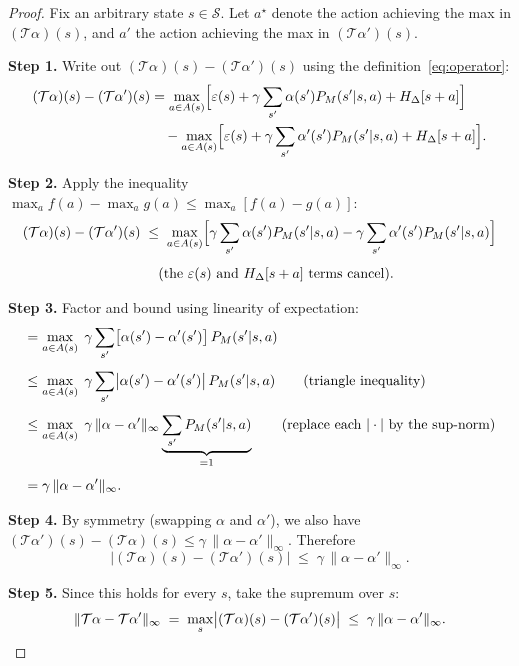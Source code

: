 \documentclass[11pt]{article}
\begin{document}
\begin{proof}
Fix an arbitrary state $s \in \mathcal{S}$.  Let $a^\star$ denote the action
achieving the max in $(\mathcal{T}\alpha)(s)$, and $a'$ the action achieving
the max in $(\mathcal{T}\alpha')(s)$.

\medskip
\textbf{Step 1.} Write out $(\mathcal{T}\alpha)(s) - (\mathcal{T}\alpha')(s)$
using the definition~\eqref{eq:operator}:
\begin{align}
  (\mathcal{T}\alpha)(s) - (\mathcal{T}\alpha')(s)
  &= \max_{a \in A(s)} \Bigl[\varepsilon(s)
     + \gamma \sum_{s'} \alpha(s') P_M(s'|s,a) + H_\Delta[s+a]\Bigr]
     \notag \\
  &\quad - \max_{a \in A(s)} \Bigl[\varepsilon(s)
     + \gamma \sum_{s'} \alpha'(s') P_M(s'|s,a) + H_\Delta[s+a]\Bigr].
     \label{eq:diff}
\end{align}

\textbf{Step 2.} Apply the inequality $\max_a f(a) - \max_a g(a) \le \max_a [f(a) - g(a)]$:
\begin{align}
  (\mathcal{T}\alpha)(s) - (\mathcal{T}\alpha')(s)
  &\;\le\; \max_{a \in A(s)} \Bigl[
    \gamma \sum_{s'} \alpha(s') P_M(s'|s,a)
    - \gamma \sum_{s'} \alpha'(s') P_M(s'|s,a)
  \Bigr] \notag \\[4pt]
  &\quad\; \text{(the $\varepsilon(s)$ and $H_\Delta[s+a]$ terms cancel).}
  \label{eq:cancel}
\end{align}

\textbf{Step 3.} Factor and bound using linearity of expectation:
\begin{align}
  &= \max_{a \in A(s)}\; \gamma \sum_{s'} \bigl[\alpha(s') - \alpha'(s')\bigr]
     \, P_M(s'|s,a) \notag \\[4pt]
  &\le \max_{a \in A(s)}\; \gamma \sum_{s'} \bigl|\alpha(s') - \alpha'(s')\bigr|
       \, P_M(s'|s,a)
       \qquad \text{(triangle inequality)} \notag \\[4pt]
  &\le \max_{a \in A(s)}\; \gamma \,\|\alpha - \alpha'\|_\infty
       \underbrace{\sum_{s'} P_M(s'|s,a)}_{= 1}
       \qquad \text{(replace each $|\cdot|$ by the sup-norm)} \notag \\[4pt]
  &= \gamma\, \|\alpha - \alpha'\|_\infty.
  \label{eq:upper}
\end{align}

\textbf{Step 4.} By symmetry (swapping $\alpha$ and $\alpha'$), we also have
$(\mathcal{T}\alpha')(s) - (\mathcal{T}\alpha)(s) \le \gamma\,\|\alpha - \alpha'\|_\infty$.
Therefore
\[
  \bigl|(\mathcal{T}\alpha)(s) - (\mathcal{T}\alpha')(s)\bigr|
  \;\le\; \gamma\,\|\alpha - \alpha'\|_\infty.
\]

\textbf{Step 5.} Since this holds for every $s$, take the supremum over $s$:
\[
  \|\mathcal{T}\alpha - \mathcal{T}\alpha'\|_\infty
  \;=\; \max_s \bigl|(\mathcal{T}\alpha)(s) - (\mathcal{T}\alpha')(s)\bigr|
  \;\le\; \gamma\,\|\alpha - \alpha'\|_\infty.
  \qedhere
\]
\end{proof}
\end{document}

